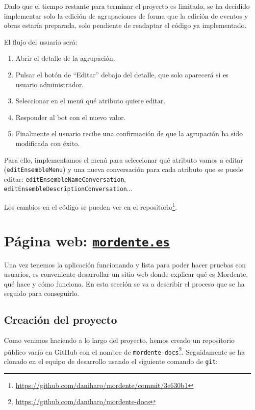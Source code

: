 Dado que el tiempo restante para terminar el proyecto es limitado, se ha decidido implementar solo la edición de agrupaciones de forma que la edición de eventos y obras estaría preparada, solo pendiente de readaptar el código ya implementado.

El flujo del usuario será:
\begin{enumerate}
    \item Abrir el detalle de la agrupación.
    \item Pulsar el botón de ``Editar'' debajo del detalle, que solo aparecerá si es usuario administrador.
    \item Seleccionar en el menú qué atributo quiere editar.
    \item Responder al bot con el nuevo valor.
    \item Finalmente el usuario recibe una confirmación de que la agrupación ha sido modificada con éxito.
\end{enumerate}

\sloppy
Para ello, implementamos el menú para seleccionar qué atributo vamos a editar (\texttt{editEnsembleMenu}) y una nueva conversación para cada atributo que se puede editar: \texttt{editEnsembleNameConversation}, \texttt{editEnsembleDescriptionConversation}...

Los cambios en el código se pueden ver en el repositorio\footnote{\url{https://github.com/daniharo/mordente/commit/3e630b1}}.


\section{Página web: \href{https://mordente.es}{\texttt{mordente.es}}}

Una vez tenemos la aplicación funcionando y lista para poder hacer pruebas con usuarios, es conveniente desarrollar un sitio web donde explicar qué es Mordente, qué hace y cómo funciona. En esta sección se va a describir el proceso que se ha seguido para conseguirlo.

\subsection{Creación del proyecto}

Como venimos haciendo a lo largo del proyecto, hemos creado un repositorio público vacío en GitHub con el nombre de \texttt{mordente-docs}\footnote{\url{https://github.com/daniharo/mordente-docs}}. Seguidamente se ha clonado en el equipo de desarrollo usando el siguiente comando de \texttt{git}:


